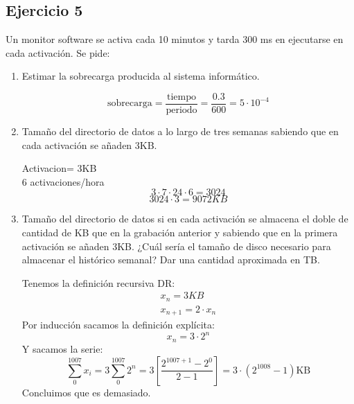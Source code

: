 \subsection{Ejercicio 5}
\noindent
Un monitor software se activa cada 10 minutos y tarda 300 ms en ejecutarse en cada activación. Se pide:
\begin{enumerate}
    \item Estimar la sobrecarga producida al sistema informático.
\begin{tcolorbox}[colback=white,colframe=cyan!50!black,fonttitle=\bfseries]
\[
\text{sobrecarga}=\dfrac{\text{tiempo}}{\text{periodo}}=\dfrac{0.3}{600}=5\cdot 10^{-4}
\]
\end{tcolorbox}    
    \item Tamaño del directorio de datos a lo largo de tres semanas sabiendo que en cada activación se añaden 3KB.
\begin{tcolorbox}[colback=white,colframe=cyan!50!black,fonttitle=\bfseries]
Activacion= 3KB\\
6 activaciones/hora
\[
3\cdot 7\cdot 24\cdot 6 = 3024
\]
\[
3024 \cdot 3 = 9072KB
\]
\end{tcolorbox}
    \item Tamaño del directorio de datos si en cada activación se almacena el doble de cantidad de KB que en la grabación anterior y sabiendo que en la primera activación se añaden 3KB. ¿Cuál sería el tamaño de disco necesario para almacenar el histórico semanal? Dar una cantidad aproximada en TB.
\begin{tcolorbox}[colback=white,colframe=cyan!50!black,fonttitle=\bfseries]
Tenemos la definición recursiva DR:
\[\left.\begin{array}{ll}
x_n=3KB\\
x_{n+1}=2\cdot x_n
\end{array}\right.
\]
Por inducción sacamos la definición explícita:
\[x_n=3\cdot 2^n\]
Y sacamos la serie:
\[
\sum_{0}^{1007}x_i=3\sum_0^{1007}2^n=3\left[\dfrac{2^{1007+1}-2^0}{2-1}\right]=3\cdot(2^{1008}-1)\text{KB}
\]
Concluimos que es demasiado.
\end{tcolorbox}    
\end{enumerate}
